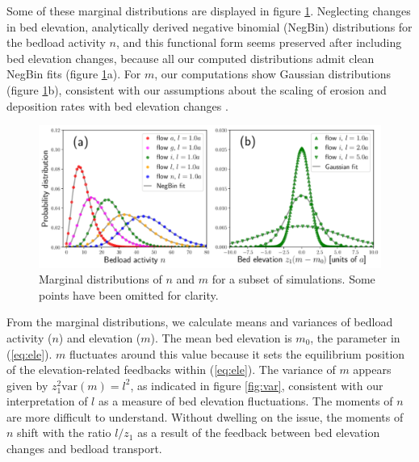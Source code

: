 \documentclass[draft]{agujournal2018}
\begin{document}
Some of these marginal distributions are displayed in figure \ref{fig:pdfs}.
Neglecting changes in bed elevation, \citet{Ancey2008} analytically derived negative binomial (NegBin) distributions for the bedload activity $n$, and this functional form seems preserved after including bed elevation changes, because all our computed distributions admit clean NegBin fits (figure \ref{fig:pdfs}a).
For $m$, our computations show Gaussian distributions (figure \ref{fig:pdfs}b), consistent with our assumptions about the scaling of erosion and deposition rates with bed elevation changes \citep[e.g.][]{Wong2007}.

\begin{figure}[t!]
	\includegraphics[width=\linewidth,keepaspectratio]{./figures/montage2.pdf}
	\caption{Marginal distributions of $n$ and $m$ for a subset of simulations. Some points have been omitted for clarity.}
	\label{fig:pdfs}
\end{figure}

From the marginal distributions, we calculate means and variances of bedload activity ($n$) and elevation ($m$).
The mean bed elevation is $m_0$, the parameter in (\ref{eq:ele}). $m$ fluctuates around this value because it sets the equilibrium position of the elevation-related feedbacks within (\ref{eq:ele}).
The variance of $m$ appears given by $z_1^2 \text{var}(m) = l^2$, as indicated in figure \ref{fig:var}, consistent with our interpretation of $l$ as a measure of bed elevation fluctuations.
The moments of $n$ are more difficult to understand.
Without dwelling on the issue, the moments of $n$ shift with the ratio $l/z_1$ as a result of the feedback between bed elevation changes and bedload transport.
\end{document}
